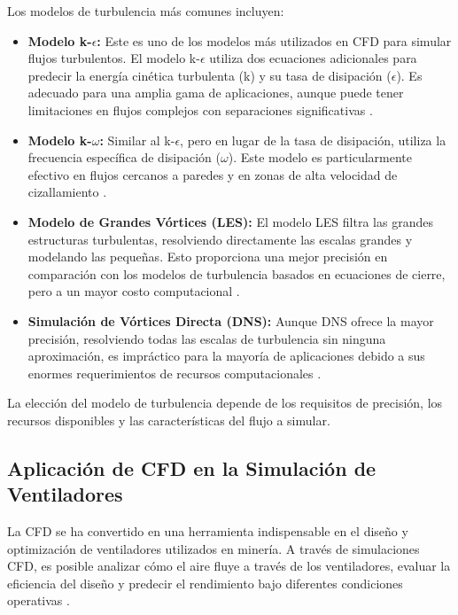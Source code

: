 Los modelos de turbulencia más comunes incluyen:

\begin{itemize}
    \item \textbf{Modelo k-$\epsilon$:} Este es uno de los modelos más utilizados en CFD para simular flujos turbulentos. El modelo k-$\epsilon$ utiliza dos ecuaciones adicionales para predecir la energía cinética turbulenta (k) y su tasa de disipación ($\epsilon$). Es adecuado para una amplia gama de aplicaciones, aunque puede tener limitaciones en flujos complejos con separaciones significativas \cite{launder1974application}.
    
    \item \textbf{Modelo k-$\omega$:} Similar al k-$\epsilon$, pero en lugar de la tasa de disipación, utiliza la frecuencia específica de disipación ($\omega$). Este modelo es particularmente efectivo en flujos cercanos a paredes y en zonas de alta velocidad de cizallamiento \cite{wilcox1998turbulence}.
    
    \item \textbf{Modelo de Grandes Vórtices (LES):} El modelo LES filtra las grandes estructuras turbulentas, resolviendo directamente las escalas grandes y modelando las pequeñas. Esto proporciona una mejor precisión en comparación con los modelos de turbulencia basados en ecuaciones de cierre, pero a un mayor costo computacional \cite{lesieur2005large}.
    
    \item \textbf{Simulación de Vórtices Directa (DNS):} Aunque DNS ofrece la mayor precisión, resolviendo todas las escalas de turbulencia sin ninguna aproximación, es impráctico para la mayoría de aplicaciones debido a sus enormes requerimientos de recursos computacionales \cite{moin1998direct}.
\end{itemize}

La elección del modelo de turbulencia depende de los requisitos de precisión, los recursos disponibles y las características del flujo a simular.

\subsection{Aplicación de CFD en la Simulación de Ventiladores}

La CFD se ha convertido en una herramienta indispensable en el diseño y optimización de ventiladores utilizados en minería. A través de simulaciones CFD, es posible analizar cómo el aire fluye a través de los ventiladores, evaluar la eficiencia del diseño y predecir el rendimiento bajo diferentes condiciones operativas \cite{versteeg2007introduction}.

